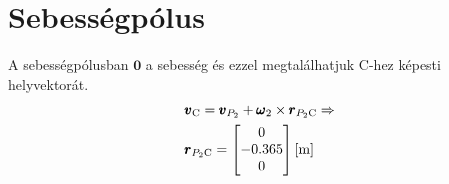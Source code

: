 \section{Sebességpólus}
A sebességpólusban $\pmb{0}$ a sebesség és ezzel megtalálhatjuk $\text{C}$-hez képesti helyvektorát.
\begin{align}
	&\pmb{v}_\text{C} = \pmb{v}_{P_2} + \pmb{\omega}_2 \times \pmb{r}_{{P_2}\text{C}} \Rightarrow \\
	&\pmb{r}_{{P_2}\text{C}} =
	\begin{bmatrix}
		0 \\ -0.365 \\ 0
	\end{bmatrix} \siunit{}{\m}
\end{align}

\structurespeedpole
